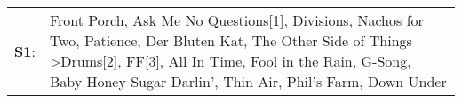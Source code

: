 \begin{supertabular}{p{0.03\textwidth}p{0.92\textwidth}}
 \textbf{S1}:  &  Front Porch\textsuperscript{}, \enspace Ask Me No Questions[1]\textsuperscript{}, \enspace Divisions\textsuperscript{}, \enspace Nachos for Two\textsuperscript{}, \enspace Patience\textsuperscript{}, \enspace Der Bluten Kat\textsuperscript{}, \enspace The Other Side of Things\textsuperscript{} \textgreater \enspace Drums[2]\textsuperscript{}, \enspace FF[3]\textsuperscript{}, \enspace All In Time\textsuperscript{}, \enspace Fool in the Rain\textsuperscript{}, \enspace G-Song\textsuperscript{}, \enspace Baby Honey Sugar Darlin'\textsuperscript{}, \enspace Thin Air\textsuperscript{}, \enspace Phil's Farm\textsuperscript{}, \enspace Down Under\textsuperscript{}  \enspace  \\
\end{supertabular}

